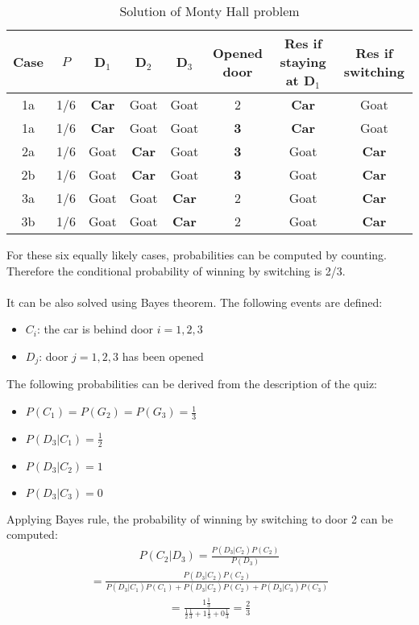 \documentclass{report}
\begin{document}
\begin{table}[h!]
\begin{center}
\begin{tabular}{c||c||c|c|c||c|c|c}
Case & $P$ & D$_1$ & D$_2$ & D$_3$ & Opened door & Res if staying at D$_1$ & Res if switching \\
\hline
\hline
1a & 1/6 & {\bf Car} & Goat & Goat & 2 & {\bf Car} & Goat \\
\hline
1a & 1/6 & {\bf Car} & Goat & Goat & {\bf 3} & {\bf Car} & Goat \\
\hline
2a & 1/6 & Goat & {\bf Car} & Goat & {\bf 3} & Goat & {\bf Car} \\
\hline
2b & 1/6 & Goat & {\bf Car} & Goat &{\bf 3} & Goat & {\bf Car} \\
\hline
3a & 1/6 & Goat & Goat & {\bf Car} & 2 & Goat & {\bf Car} \\
\hline
3b & 1/6 & Goat & Goat & {\bf Car} & 2 & Goat & {\bf Car} \\
\end{tabular}
\end{center}
\caption{Solution of Monty Hall problem}
\label{table:montyhallsolution}
\end{table}

For these six equally likely cases, probabilities can be computed by counting.
Therefore the conditional probability of winning by switching is 2/3.
\\
\\
It can be also solved using Bayes theorem. The following events are defined:
\begin{itemize}
\item $C_i$: the car is behind door $i = 1, 2, 3$
\item $D_j$: door $j = 1, 2, 3$ has been opened
\end{itemize}

The following probabilities can be derived from the description of the quiz:
\begin{itemize}
\item $P(C_1) = P(G_2) = P(G_3) = \frac{1}{3}$
\item $P(D_3\vert C_1) = \frac{1}{2}$
\item $P(D_3\vert C_2) = 1$
\item $P(D_3\vert C_3) = 0$
\end{itemize}

Applying Bayes rule, the probability of winning by switching to door 2 can be computed:
\begin{align*}
P(C_2\vert D_3) = \frac{P(D_3\vert C_2)P(C_2)}{P(D_3)}
\end{align*}
\begin{align*}
= \frac{P(D_3\vert C_2)P(C_2)}{P(D_3\vert C_1)P(C_1) + P(D_3\vert C_2)P(C_2) + P(D_3\vert C_3)P(C_3)}
\end{align*}
\begin{align*}
= \frac{1\frac{1}{3}}{\frac{1}{2}\frac{1}{3}+1\frac{1}{3}+0\frac{1}{3}} = \frac{2}{3}
\end{align*}
\end{document}
